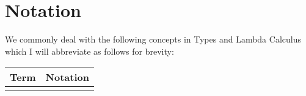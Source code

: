 \section{Notation}

We commonly deal with the following concepts in 
Types and Lambda Calculus
which I will abbreviate as follows for brevity:
\begin{center}
    \begin{tabular}{ | r | c | }
        \hline
        Term & Notation \\
        \hline \hline
        \\
        \hline
    \end{tabular}
\end{center}